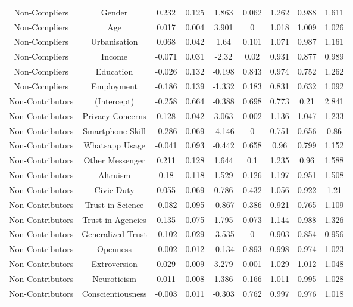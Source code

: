 \begin{table}[!htbp]
\begin{tabular}{@{\extracolsep{5pt}} ccccccccc}
Non-Compliers & Gender & 0.232 & 0.125 & 1.863 & 0.062 & 1.262 & 0.988 & 1.611 \\ 
Non-Compliers & Age & 0.017 & 0.004 & 3.901 & 0 & 1.018 & 1.009 & 1.026 \\ 
Non-Compliers & Urbanisation & 0.068 & 0.042 & 1.64 & 0.101 & 1.071 & 0.987 & 1.161 \\ 
Non-Compliers & Income & -0.071 & 0.031 & -2.32 & 0.02 & 0.931 & 0.877 & 0.989 \\ 
Non-Compliers & Education & -0.026 & 0.132 & -0.198 & 0.843 & 0.974 & 0.752 & 1.262 \\ 
Non-Compliers & Employment & -0.186 & 0.139 & -1.332 & 0.183 & 0.831 & 0.632 & 1.092 \\ 
Non-Contributors & (Intercept) & -0.258 & 0.664 & -0.388 & 0.698 & 0.773 & 0.21 & 2.841 \\ 
Non-Contributors & Privacy Concerns & 0.128 & 0.042 & 3.063 & 0.002 & 1.136 & 1.047 & 1.233 \\ 
Non-Contributors & Smartphone Skill & -0.286 & 0.069 & -4.146 & 0 & 0.751 & 0.656 & 0.86 \\ 
Non-Contributors & Whatsapp Usage & -0.041 & 0.093 & -0.442 & 0.658 & 0.96 & 0.799 & 1.152 \\ 
Non-Contributors & Other Messenger & 0.211 & 0.128 & 1.644 & 0.1 & 1.235 & 0.96 & 1.588 \\ 
Non-Contributors & Altruism & 0.18 & 0.118 & 1.529 & 0.126 & 1.197 & 0.951 & 1.508 \\ 
Non-Contributors & Civic Duty & 0.055 & 0.069 & 0.786 & 0.432 & 1.056 & 0.922 & 1.21 \\ 
Non-Contributors & Trust in Science & -0.082 & 0.095 & -0.867 & 0.386 & 0.921 & 0.765 & 1.109 \\ 
Non-Contributors & Trust in Agencies & 0.135 & 0.075 & 1.795 & 0.073 & 1.144 & 0.988 & 1.326 \\ 
Non-Contributors & Generalized Trust & -0.102 & 0.029 & -3.535 & 0 & 0.903 & 0.854 & 0.956 \\ 
Non-Contributors & Openness & -0.002 & 0.012 & -0.134 & 0.893 & 0.998 & 0.974 & 1.023 \\ 
Non-Contributors & Extroversion & 0.029 & 0.009 & 3.279 & 0.001 & 1.029 & 1.012 & 1.048 \\ 
Non-Contributors & Neuroticism & 0.011 & 0.008 & 1.386 & 0.166 & 1.011 & 0.995 & 1.028 \\ 
Non-Contributors & Conscientiousness & -0.003 & 0.011 & -0.303 & 0.762 & 0.997 & 0.976 & 1.018 \\ 

\end{tabular}
\end{table}
